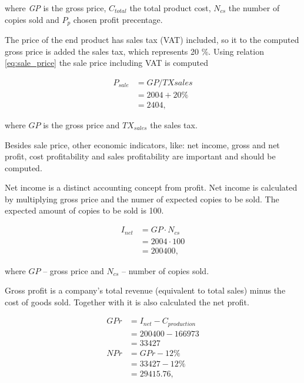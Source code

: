 \noindent
where \textit{GP} is the gross price, $C_{total}$ the total product cost, $N_{cs}$ the number of copies sold and $P_{p}$ chosen profit precentage. 

The price of the end product has sales tax (VAT) included, so it to the computed gross price is added the sales tax, which represents 20 \%. Using relation \ref{eq:sale_price} the sale price including VAT is computed

\begin{equation}\label{sale_price}
 \begin{split}
  P_{sale} &= GP / TX{sales}\\
           &= 2004 + 20 \% \\
           &= 2404,
 \end{split}
\end{equation}

\noindent
where $GP$ is the gross price and $TX_{sales}$ the sales tax. 

Besides sale price, other economic indicators, like: net income, gross and net profit, cost profitability and sales profitability are important and should be computed. 

Net income is a distinct accounting concept from profit. Net income is calculated by multiplying gross price and the numer of expected copies to be sold. The expected amount of copies to be sold is 100.

\begin{equation}
 \begin{split}
  I_{net} &= GP \cdot N_{cs}\\
          &= 2004  \cdot 100 \\
          &= 200400,
 \end{split}
\end{equation}

\noindent
where $GP$ -- gross price and $N_{cs}$ -- number of copies sold.

Gross profit is a company's total revenue (equivalent to total sales) minus the cost of goods sold. Together with it is also calculated the net profit. 

\begin{equation}
 \begin{split}
  GPr &= I_{net} - C_{production}\\
      &= 200400 - 166973\\
      &= 33427\\
  NPr &= GPr - 12\% \\
      &= 33427 - 12\% \\
      &= 29415.76,
 \end{split}
\end{equation}


